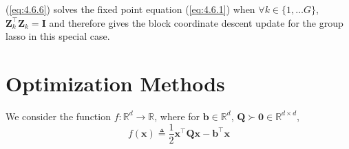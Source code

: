 \documentclass{article}
\numberwithin{equation}{section}
\begin{document}
(\ref{eq:4.6.6}) solves the fixed point equation (\ref{eq:4.6.1}) when
$ \forall k \in \{1, \ldots G\} $,
$ \mathbf{Z}_k^\top\mathbf{Z}_k = \mathbf{I} $ and therefore gives the block
coordinate descent update for the group lasso in this special case.

\section{Optimization Methods}


We consider the function $ f : \mathbb{R}^d \rightarrow \mathbb{R} $, where
for $ \mathbf{b} \in \mathbb{R}^d $, $ \mathbf{Q} \succ \mathbf{0} \in
\mathbb{R}^{d \times d} $,
\begin{equation} \label{eq:5.1.1}
    f(\mathbf{x}) \triangleq
    \frac{1}{2}\mathbf{x}^\top\mathbf{Qx} - \mathbf{b}^\top\mathbf{x}
\end{equation}
\end{document}

